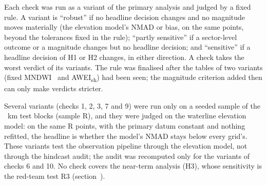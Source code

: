 
Each check was run as a variant of the primary analysis and judged by a fixed rule. A variant is ``robust'' if no headline decision changes and no magnitude moves materially (the elevation model's NMAD or bias, on the same points, beyond the tolerances fixed in the rule); ``partly sensitive'' if a sector-level outcome or a magnitude changes but no headline decision; and ``sensitive'' if a headline decision of H1 or H2 changes, in either direction. A check takes the worst verdict of its variants. The rule was finalised after the tables of two variants (fixed MNDWI~ and AWEI\textsubscript{sh}) had been seen; the magnitude criterion added then can only make verdicts stricter.

Several variants (checks 1, 2, 3, 7 and 9) were run only on a seeded sample of the ~km test blocks (sample R), and they were judged on the waterline elevation model: on the same R points, with the primary datum constant and nothing refitted, the headline is whether the model's NMAD stays below every grid's. These variants test the observation pipeline through the elevation model, not through the hindcast audit; the audit was recomputed only for the variants of checks 6 and 10. No check covers the near-term analysis (H3), whose sensitivity is the red-team test R3 (section~\SIredteam).

